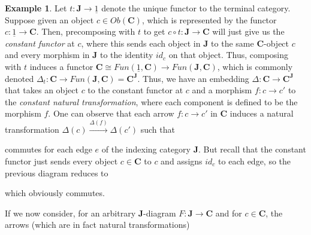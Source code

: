 \documentclass[a4paper]{book}
\theoremstyle{definition}
\newtheorem{example}{Example}[section]
\theoremstyle{definition}
\theoremstyle{definition}
\theoremstyle{theorem}
\theoremstyle{definition}
\begin{document}
\begin{example}
	Let $t: \textbf{J} \rightarrow \underline{1}$ denote the unique functor to the terminal category. Suppose given an object $c \in Ob(\textbf{C})$, which is represented by the functor $c: \underline{1} \rightarrow \textbf{C}$. Then, precomposing with $t$ to get $c \circ t: \textbf{J} \rightarrow \textbf{C}$ will just give us the \textit{constant functor} at $c$, where this sends each object in \textbf{J} to the same \textbf{C}-object $c$ and every morphism in \textbf{J} to the identity $id_c$ on that object. Thus, composing with $t$ induces a functor $\textbf{C} \cong Fun(\underline{1}, \textbf{C}) \rightarrow Fun(\textbf{J}, \textbf{C})$, which is commonly denoted $\Delta_t: \textbf{C} \rightarrow Fun(\textbf{J}, \textbf{C}) = \textbf{C}^{\textbf{J}}$. Thus, we have an embedding $\Delta: \textbf{C} \rightarrow \textbf{C}^{\textbf{J}}$ that takes an object $c$ to the constant functor at $c$ and a morphism $f: c \rightarrow c'$ to the \textit{constant natural transformation}, where each component is defined to be the morphism $f$. One can observe that each arrow $f: c \rightarrow c'$ in \textbf{C} induces a natural transformation $\Delta(c) \xrightarrow{\Delta(f)} \Delta(c')$ such that 
	\begin{center} 
	\end{center} \par \noindent 
	commutes for each edge $e$ of the indexing category $\textbf{J}$. But recall that the constant functor just sends every object $c \in \textbf{C}$ to $c$ and assigns $id_c$ to each edge, so the previous diagram reduces to 
	\begin{center} 
	\end{center} \par \noindent 
	which obviously commutes. \par 
	If we now consider, for an arbitrary $\textbf{J}$-diagram $F: \textbf{J} \rightarrow \textbf{C}$ and for $c \in \textbf{C}$, the arrows (which are in fact natural transformations)

\end{example}
\end{document}
